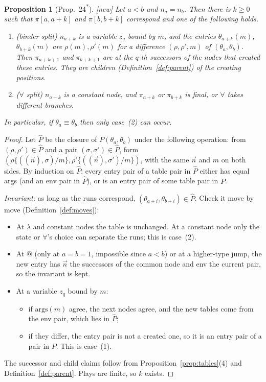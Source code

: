 \documentclass[11pt]{article}
\newcommand{\iv}[2]{\pi[#1,#2]}
\newcommand{\args}{\mathrm{args}}
\newcommand{\New}{\textsf{[new]}}
\theoremstyle{plain}
\newtheorem{proposition}[theorem]{Proposition}
\theoremstyle{definition}
\theoremstyle{remark}
\begin{document}
\begin{proposition}[Prop.~24\textsuperscript{*}]\label{prop:24star}
\New{} Let $a<b$ and $n_a=n_b$.  Then there is $k\ge0$ such that
$\iv a{a+k}$ and $\iv b{b+k}$ correspond and one of the following
holds.
\begin{enumerate}
\item[(1)] \emph{(binder split)} $n_{a+k}$ is a variable $z_q$ bound by
  $m$, and the entries $\theta_{a+k}(m)$, $\theta_{b+k}(m)$ are
  $\rho(m),\rho'(m)$ for a difference $(\rho,\rho',m)$ of
  $(\theta_a,\theta_b)$.  Then $\pi_{a+k+1}$ and $\pi_{b+k+1}$ are at the
  $q$-th successors of the nodes that created these entries.  They are
  children (Definition~\ref{def:parent}) of the creating positions.
\item[(2)] \emph{($\forall$ split)} $n_{a+k}$ is a constant node, and
  $\pi_{a+k}$ or $\pi_{b+k}$ is final, or $\forall$ takes different
  branches.
\end{enumerate}
In particular, if $\theta_a\equiv\theta_b$ then only case~(2) can occur.
\end{proposition}
\begin{proof}
Let $\hat P$ be the closure of $P(\theta_a,\theta_b)$ under the
following operation: from $(\rho,\rho')\in\hat P$ and a pair
$(\sigma,\sigma')\in\hat P$, form
$(\rho\{((\vec n),\sigma)/m\},\rho'\{((\vec n),\sigma')/m\})$, with the
same $\vec n$ and $m$ on both sides.  By induction on $\hat P$: every
entry pair of a table pair in $\hat P$ either has equal args (and an env
pair in $\hat P$), or is an entry pair of some table pair in $P$.

\emph{Invariant:} as long as the runs correspond,
$(\theta_{a+i},\theta_{b+i})\in\hat P$.  Check it move by move
(Definition~\ref{def:moves}):
\begin{itemize}
\item At $\lambda$ and constant nodes the table is unchanged.  At a
  constant node only the state or $\forall$'s choice can separate the
  runs; this is case~(2).
\item At $@$ (only at $a=b=1$, impossible since $a<b$) or at a
  higher-type jump, the new entry has $\vec n$ the successors of the
  common node and env the current pair, so the invariant is kept.
\item At a variable $z_q$ bound by $m$:
  \begin{itemize}
  \item if $\args(m)$ agree, the next nodes agree, and the new tables
    come from the env pair, which lies in $\hat P$;
  \item if they differ, the entry pair is not a created one, so it is
    an entry pair of a pair in $P$.  This is case~(1).
  \end{itemize}
\end{itemize}
The successor and child claims follow from
Proposition~\ref{prop:tables}(4) and Definition~\ref{def:parent}.
Plays are finite, so $k$ exists.
\end{proof}
\end{document}
